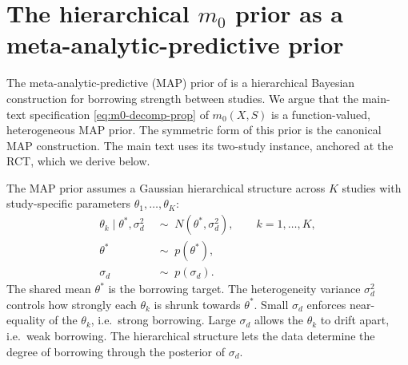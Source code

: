 \newpage
\section{The hierarchical $m_0$ prior as a meta-analytic-predictive prior}\label{sm:map-m0}

The meta-analytic-predictive (MAP) prior of \citet{neuenschwander2010} is a hierarchical Bayesian construction for borrowing strength between studies.
We argue that the main-text specification \eqref{eq:m0-decomp-prop} of $m_0(X, S)$ is a function-valued, heterogeneous MAP prior.
The symmetric form of this prior is the canonical MAP construction.
The main text uses its two-study instance, anchored at the RCT, which we derive below.

The MAP prior assumes a Gaussian hierarchical structure across $K$ studies with study-specific parameters $\theta_1, \ldots, \theta_K$:
\begin{align}
\theta_k \mid \theta^*, \sigma_d^2 &\;\sim\; N(\theta^*, \sigma_d^2), \qquad k = 1, \ldots, K, \\
\theta^* &\;\sim\; p(\theta^*), \\
\sigma_d &\;\sim\; p(\sigma_d).
\label{eq:map-scalar}
\end{align}
The shared mean $\theta^*$ is the borrowing target.
The heterogeneity variance $\sigma_d^2$ controls how strongly each $\theta_k$ is shrunk towards $\theta^*$.
Small $\sigma_d$ enforces near-equality of the $\theta_k$, i.e.\ strong borrowing.
Large $\sigma_d$ allows the $\theta_k$ to drift apart, i.e.\ weak borrowing.
The hierarchical structure lets the data determine the degree of borrowing through the posterior of $\sigma_d$.

